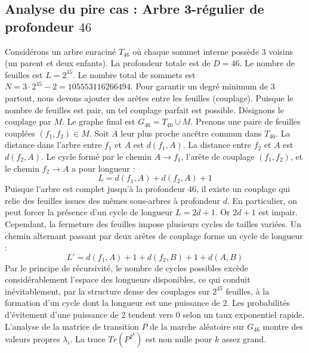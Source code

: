 \documentclass[11pt,a4paper]{article}
\begin{document}
\subsection{Analyse du pire cas : Arbre 3-régulier de profondeur $46$}
Considérons un arbre enraciné $T_46$ où chaque sommet interne possède 3 voisins (un parent et deux enfants).
La profondeur totale est de $D = 46$.
Le nombre de feuilles est $L = 2^{45}$.
Le nombre total de sommets est $N = 3 \cdot 2^{45} - 2 = 105553116266494$.
Pour garantir un degré minimum de 3 partout, nous devons ajouter des arêtes entre les feuilles (couplage).
Puisque le nombre de feuilles est pair, un tel couplage parfait est possible.
Désignons le couplage par $M$. Le graphe final est $G_46 = T_46 \cup M$.
Prenons une paire de feuilles couplées $(f_1, f_2) \in M$.
Soit $A$ leur plus proche ancêtre commun dans $T_46$.
La distance dans l'arbre entre $f_1$ et $A$ est $d(f_1, A)$.
La distance entre $f_2$ et $A$ est $d(f_2, A)$.
Le cycle formé par le chemin $A \to f_1$, l'arête de couplage $(f_1, f_2)$, et le chemin $f_2 \to A$ a pour longueur :
$$ L = d(f_1, A) + d(f_2, A) + 1 $$
Puisque l'arbre est complet jusqu'à la profondeur $46$, il existe un couplage qui relie des feuilles issues des mêmes sous-arbres à profondeur $d$.
En particulier, on peut forcer la présence d'un cycle de longueur $L = 2d + 1$. Or $2d+1$ est impair.
Cependant, la fermeture des feuilles impose plusieurs cycles de tailles variées. Un chemin alternant passant par deux arêtes de couplage forme un cycle de longueur :
$$ L' = d(f_1, A) + 1 + d(f_2, B) + 1 + d(A, B) $$
Par le principe de récursivité, le nombre de cycles possibles excède considérablement l'espace des longueurs disponibles, ce qui conduit inévitablement, par la structure dense des couplages sur $2^{45}$ feuilles, à la formation d'un cycle dont la longueur est une puissance de 2. Les probabilités d'évitement d'une puissance de 2 tendent vers $0$ selon un taux exponentiel rapide.
L'analyse de la matrice de transition $P$ de la marche aléatoire sur $G_46$ montre des valeurs propres $\lambda_i$. La trace $Tr(P^{2^k})$ est non nulle pour $k$ assez grand.
\end{document}
